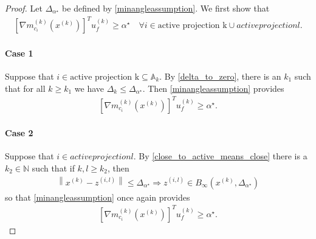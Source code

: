 \documentclass{article}
\theoremstyle{case}
\numberwithin{theorem}{subsection}
\newcommand{\activeconstraintsk}{{\mathbb A_{k}}}
\newcommand{\dk}{\Delta_k}
\newcommand{\dl}{\Delta_l}
\newcommand{\gmcik}{{\nabla m_{c_i}^{(k)}\left(\xk\right)}}
\newcommand{\minanglealpha}{{ \alpha^{\star} }}
\newcommand{\minangledelta}{{\Delta_{\alpha^{\star}}}}
\newcommand{\naturals}{\mathbb N}
\newcommand{\xk}{x^{(k)}}
\newcommand{\xl}{{x^{(l)}}}
\newcommand{\zil}{{z^{(i, l)}}}
\newcommand{\minangledirk}{{u^{(k)}_f}}
\newcommand{\activeprojk}{{\textrm{active projection k}}}
\newcommand{\activeprojl}{{active projection l}}
\begin{document}
\begin{proof}
Let $\minangledelta$ be defined by \cref{minangleassumption}.
We first show that 
\begin{align*}
\left[\gmcik\right]^T \minangledirk \ge \minanglealpha \quad \forall i \in \activeprojk \cup \activeprojl.
\end{align*}


\paragraph{Case 1}
Suppose that $i \in \activeprojk \subseteq \activeconstraintsk$.
By \cref{delta_to_zero}, there is an $k_1$ such that for all $k \ge k_1$ we have $\dk \le \minangledelta$.
Then \cref{minangleassumption} provides
\begin{align*}
\left[\gmcik\right]^T \minangledirk \ge \minanglealpha.
\end{align*}

\paragraph{Case 2}
Suppose that $i \in \activeprojl$.
By \cref{close_to_active_means_close} there is a $k_2 \in \naturals$ such that if 
$k, l \ge k_2$, then
\begin{align*}
\left\| \xk - \zil \right\| \le \minangledelta
\Longrightarrow
\zil \in B_{\infty}\left(\xk, \minangledelta \right)
\end{align*}
so that \cref{minangleassumption} once again provides
\begin{align*}
\left[\gmcik\right]^T \minangledirk \ge \minanglealpha.
\end{align*}


\end{proof}
\end{document}
